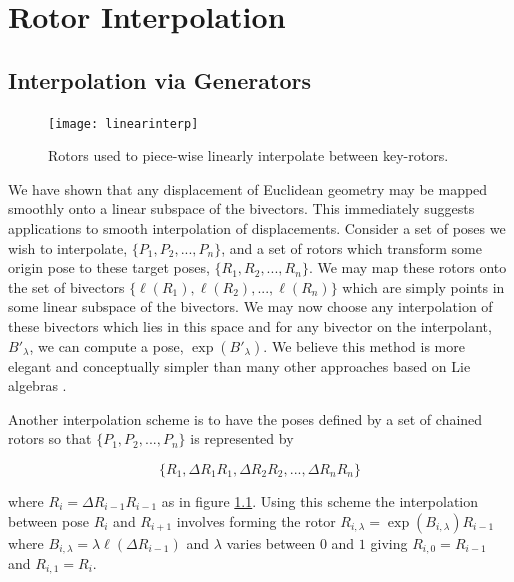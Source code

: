 \begin{savequote}
\end{savequote}

\chapter{Rotor Interpolation}

\section{Interpolation via Generators}

\begin{figure}[t]
\centering
\texttt{[image: linearinterp]}
\caption{\label{fig:linearinterp}Rotors used to piece-wise linearly interpolate between key-rotors.}
\end{figure}

We have shown that any displacement of Euclidean geometry
may be mapped smoothly
onto a linear subspace of the bivectors. This immediately suggests applications to smooth interpolation
of displacements. Consider a set of poses we wish to interpolate, $\{P_1, P_2, ..., P_n\}$, and a set
of rotors which transform some origin pose to these target poses, $\{R_1, R_2, ..., R_n\}$. We
may map these rotors onto the set of bivectors $\{\ell(R_1), \ell(R_2), ..., \ell(R_n)\}$ which
are simply points in some linear subspace of the bivectors. We may now choose any interpolation of these bivectors
which lies in this space and for any bivector on the interpolant, $B'_\lambda$, we can compute
a pose, $\exp(B'_\lambda)$. We believe this method is more elegant and conceptually simpler
than many other approaches based on Lie algebras \cite{LIE:Consistentmotion, LIE:Moak,
  LIE:ROT, LIE:Sphericalfun}.

Another interpolation scheme is to have the poses defined by a set of chained rotors so that
$\{P_1, P_2, ..., P_n\}$ is represented by 

\[\{R_1, \Delta R_1R_1, \Delta R_2 R_2, ..., \Delta R_n R_n\}\]

where $R_i = \Delta R_{i-1} R_{i-1}$ as in figure \ref{fig:linearinterp}. Using
this scheme the interpolation between pose $R_i$ and $R_{i+1}$ involves forming
the rotor $R_{i,\lambda} = \exp(B_{i,\lambda})R_{i-1}$ where $B_{i,\lambda} =
\lambda \ell(\Delta R_{i-1})$ and $\lambda$ varies between $0$ and $1$ giving
$R_{i,0} = R_{i-1}$ and $R_{i,1} = R_i$.

